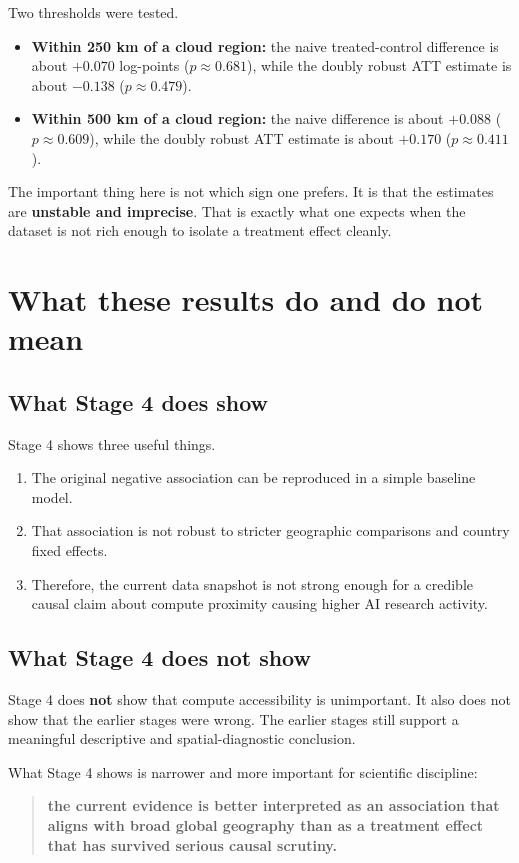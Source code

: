 \documentclass[11pt]{article}
\begin{document}
Two thresholds were tested.
\begin{itemize}[leftmargin=*]
    \item \textbf{Within 250 km of a cloud region:} the naive treated-control difference is about $+0.070$ log-points ($p \approx 0.681$), while the doubly robust ATT estimate is about $-0.138$ ($p \approx 0.479$).
    \item \textbf{Within 500 km of a cloud region:} the naive difference is about $+0.088$ ($p \approx 0.609$), while the doubly robust ATT estimate is about $+0.170$ ($p \approx 0.411$).
\end{itemize}

The important thing here is not which sign one prefers. It is that the estimates are \textbf{unstable and imprecise}. That is exactly what one expects when the dataset is not rich enough to isolate a treatment effect cleanly.

\section{What these results do and do not mean}
\subsection{What Stage 4 does show}
Stage 4 shows three useful things.
\begin{enumerate}[leftmargin=*]
    \item The original negative association can be reproduced in a simple baseline model.
    \item That association is not robust to stricter geographic comparisons and country fixed effects.
    \item Therefore, the current data snapshot is not strong enough for a credible causal claim about compute proximity causing higher AI research activity.
\end{enumerate}

\subsection{What Stage 4 does not show}
Stage 4 does \textbf{not} show that compute accessibility is unimportant. It also does not show that the earlier stages were wrong. The earlier stages still support a meaningful descriptive and spatial-diagnostic conclusion.

What Stage 4 shows is narrower and more important for scientific discipline:
\begin{quote}
\textbf{the current evidence is better interpreted as an association that aligns with broad global geography than as a treatment effect that has survived serious causal scrutiny.}
\end{quote}
\end{document}
